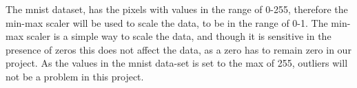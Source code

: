 


The \gls{mnist} dataset, has the pixels with values in the range of 0-255, therefore the min-max scaler will be used to scale the data, to be in the range of 0-1. The min-max scaler is a simple way to scale the data, and though it is sensitive in the presence of zeros this does not affect the data, as a zero has to remain zero in our project. As the values in the \gls{mnist} data-set is set to the max of 255, outliers will not be a problem in this project.